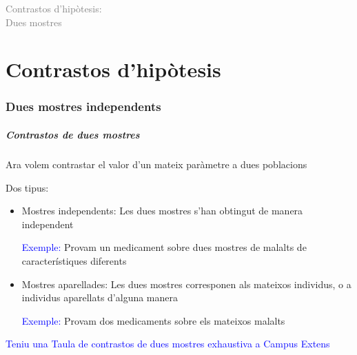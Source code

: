 \documentclass[12pt,t]{beamer}\usepackage[]{graphicx}\usepackage[]{color}
\title[\red{Matemàtiques III}]{}
\author[]{}
\date{}
\newcommand{\blue}[1]{\textcolor{blue}{#1}}
\newcommand{\gray}[1]{\textcolor{gray}{#1}}
\renewcommand{\emph}[1]{{\color{red}#1}}
\theoremstyle{plain}
\theoremstyle{definition}
\begin{document}
\beamertemplatedotitem

\lstset{breaklines=true}
\lstset{basicstyle=\ttfamily}


\begin{frame}
\vfill
\begin{center}
\gray{\LARGE Contrastos d'hipòtesis:}\\[1ex]

\gray{\LARGE Dues mostres}
\end{center}
\vfill
\end{frame}




 


\part{Contrastos d'hipòtesis}
% 

\section{Dues mostres independents}

\begin{frame}
\frametitle{Contrastos de  dues mostres}

Ara volem contrastar el valor d'un mateix paràmetre a dues poblacions
\medskip

Dos tipus:
\begin{itemize}
\item \emph{Mostres independents:} Les dues mostres s'han obtingut de manera independent
\smallskip

\blue{Exemple:} Provam un medicament sobre dues mostres de malalts de característiques diferents
\medskip

\item \emph{Mostres aparellades:} Les dues mostres corresponen als mateixos
individus, o a individus aparellats d'alguna manera
\smallskip

\blue{Exemple:} Provam dos medicaments sobre els mateixos malalts
\end{itemize}



\blue{Teniu una Taula de contrastos de dues mostres exhaustiva a Campus Extens}

\end{frame}
\end{document}

